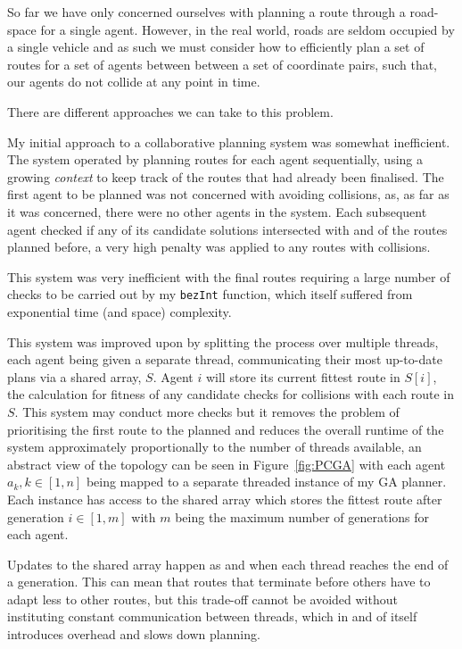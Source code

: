 So far we have only concerned ourselves with planning a route through a road-space for a single agent. However, in the real world, roads are seldom occupied by a single vehicle and as such we must consider how to efficiently plan a set of routes for a set of agents between between a set of coordinate pairs, such that, our agents do not collide at any point in time.

There are different approaches we can take to this problem. 

My initial approach  to a collaborative planning system was somewhat inefficient. The system operated by planning routes for each agent sequentially, using a growing \textit{context} to keep track of the routes that had already been finalised. The first agent to be planned was not concerned with avoiding collisions, as, as far as it was concerned, there were no other agents in the system. Each subsequent agent checked if any of its candidate solutions intersected with and of the routes planned before, a very high penalty was applied to any routes with collisions.

This system was very inefficient with the final routes requiring a large number of checks to be carried out by my \texttt{bezInt} function, which itself suffered from  exponential time (and space) complexity.

This system was improved upon by splitting the process over multiple threads, each agent being given a separate thread, communicating their most up-to-date plans via a shared array, $S$. Agent $i$ will store its current fittest route in $S[i]$, the calculation for fitness of any candidate checks for collisions with each route in $S$. This system may conduct more checks but it removes the problem of prioritising the first route to the planned and reduces the overall runtime of the system approximately proportionally to the number of threads available, an abstract view of the topology can be seen in Figure~\ref{fig:PCGA} with each agent $a_{k}, k \in [1,n]$ being mapped to a separate threaded instance of my GA planner. Each instance has access to the shared array which stores the fittest route after generation $i \in [1,m]$ with $m$ being the maximum number of generations for each agent.

Updates to the shared array happen as and when each thread reaches the end of a generation. This can mean that routes that terminate before others have to adapt less to other routes, but this trade-off cannot be avoided without instituting constant communication between threads, which in and of itself introduces overhead and slows down planning.

